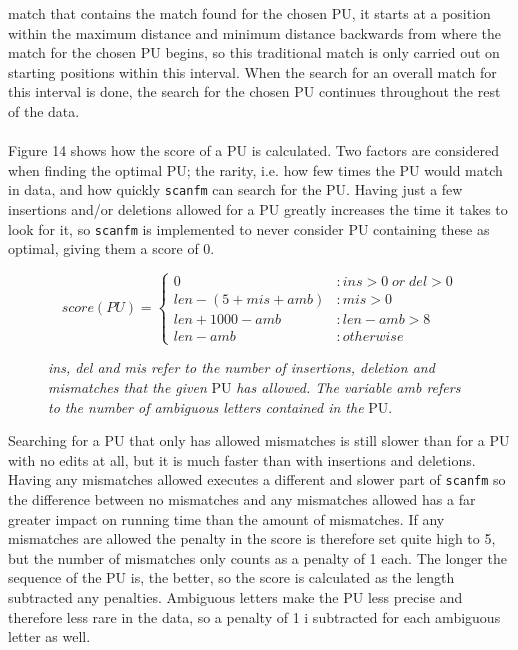 \documentclass[12pt]{article}
\newcommand{\sfm}{\texttt{scanfm} }
\newcommand{\pu}{PU }
\newcommand{\pup}{PU. }
\begin{document}
match that contains the match found for the chosen PU, it starts at a position within the maximum distance and 
minimum distance backwards from where the match for the chosen \pu begins, so this traditional match is only carried
out on starting positions within this interval. When the search for an overall match for this interval is done,
the search for the chosen \pu continues throughout the rest of the data. \\ \\
Figure 14 shows how the score of a \pu is calculated. Two factors are considered when finding the optimal PU;
the rarity, i.e. how few times the \pu would match in data, and how quickly \sfm can search for the \pup
Having just a few insertions and/or deletions allowed for a \pu greatly increases the time it takes to look for it,
so \sfm is implemented to never consider \pu containing these as optimal, giving them a score of 0.
\begin{figure}[H]
\begin{displaymath}
   score(PU) = \left\{
     \begin{array}{ll}
       0 & : ins > 0\;or\;del > 0\\
       len-(5+mis+amb) & : mis>0 \\
       len+1000-amb & : len-amb>8 \\
       len-amb & : otherwise
     \end{array}
   \right.
\end{displaymath}
\caption{\textit{ins, del and mis refer to the number of insertions, deletion and mismatches that the given} \pu
\textit{has allowed. The variable amb refers to the number of ambiguous letters contained in the} \pup} 
\end{figure}
\noindent Searching for a \pu that only has allowed mismatches is still slower than for a \pu 
with no edits at all, but it is much
faster than with insertions and deletions. Having any mismatches allowed executes a different and slower part of \sfm
so the difference between no mismatches and any mismatches allowed has a far greater impact on running time than the amount of
mismatches. If any mismatches are allowed the penalty in the score is therefore set quite high to 5, but the number of 
mismatches only counts as a penalty of 1 each. The longer the sequence of the \pu is, the better, so the score
is calculated as the length subtracted any penalties. Ambiguous letters make the \pu less precise and therefore less
rare in the data, so a penalty of 1 i subtracted for each ambiguous letter as well. \\ \\
\end{document}
